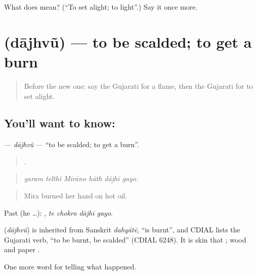 \begin{tcolorbox}[breakable,colback=teal!4,colframe=teal!35!black,title={Before you move on}]
What does  mean? (\textquotedblleft{}To set alight; to light\textquotedblright{}.) Say it once more.
\end{tcolorbox}
\section[\texorpdfstring{\gu{દાઝવું} (dājhvũ)}{દાઝવું (dājhvũ)}]{ (dājhvũ) — to be scalded; to get a burn}

\label{lesson:GU-C300-dajhvu}



\begin{quote}
Before the new one: say the Gujarati for a flame, then the Gujarati for to set alight.
\end{quote}

\subsection*{You'll want to know: }
\textbf{} — \emph{dājhvũ} — \textquotedblleft{}to be scalded; to get a burn\textquotedblright{}.

\begin{quote}
     .
\end{quote}

\begin{quote}
\emph{garam telthī Mīrāno hāth dājhī gayo.}
\end{quote}

\begin{quote}
Mira burned her hand on hot oil.
\end{quote}

Past (he …):    , \emph{te chokro dājhī gayo}.

\begin{cousinweb}
\textbf{} (\emph{dājhvũ}) is inherited from Sanskrit \emph{dahyátē}, \textquotedblleft{}is burnt\textquotedblright{}, and CDIAL lists the Gujarati verb, \textquotedblleft{}to be burnt, be scalded\textquotedblright{} (CDIAL 6248). It is skin that \textbf{ }; wood and paper \textbf{ }.
\end{cousinweb}

\begin{grammarlens}[title={What you've built}]
One more word for telling what happened.
\end{grammarlens}

